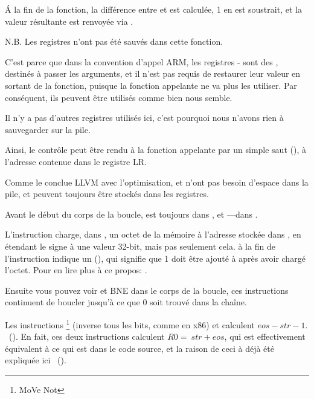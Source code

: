 Á la fin de la fonction, la différence entre  et  est calculée,
1 en est soustrait, et la valeur résultante est renvoyée via .

N.B. Les registres n'ont pas été sauvés dans cette fonction.

C'est parce que dans la convention d'appel ARM, les registres - sont
des , destinés à passer les arguments, et il n'est pas requis
de restaurer leur valeur en sortant de la fonction, puisque  la fonction appelante
ne va plus les utiliser.
Par conséquent, ils peuvent être utilisés comme bien nous semble.

Il n'y a pas d'autres registres utilisés ici, c'est pourquoi nous n'avons rien à
sauvegarder sur la pile.

Ainsi, le contrôle peut être rendu à la fonction appelante par un simple saut (),
à l'adresse contenue dans le registre \ac{LR}.

\mysubparagraph{\OptimizingXcodeIV (\ThumbMode)}



Comme le conclue LLVM avec l'optimisation,  et  n'ont pas besoin
d'espace dans la pile, et peuvent toujours être stockés dans les registres.

Avant le début du corps de la boucle,  est toujours dans , et
---dans .

L'instruction  charge, dans , un octet de la mémoire
à l'adresse stockée dans , en étendant le signe à une valeur 32-bit, mais
pas seulement cela.
 à la fin de l'instruction indique un  (),
qui signifie que 1 doit être ajouté à  après avoir chargé l'octet.
Pour en lire plus à ce propos: .

Ensuite vous pouvez voir \CMP et \ac{BNE} dans le corps de la boucle, ces instructions
continuent de boucler jusqu'à ce que 0 soit trouvé dans la chaîne.

Les instructions \footnote{MoVe Not} (inverse tous les bits, comme \NOT
en x86) et \ADD calculent $eos - str - 1$.
~().
En fait, ces deux instructions calculent $R0 = ~str + eos$, qui est effectivement
équivalent à ce qui est dans le code source, et la raison de ceci à déjà été expliquée
ici ~().

